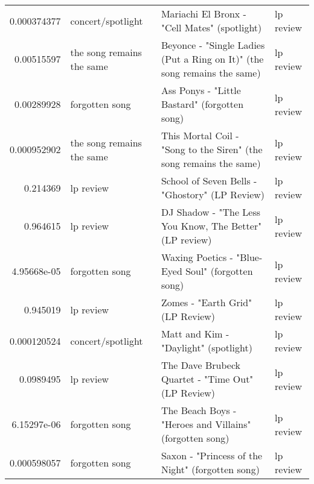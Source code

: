 \documentclass[letterpaper,10pt]{article}
\begin{document}
\begin{table}[H]
\begin{adjustbox}{max width=\linewidth}
\begin{tabular}{rlll}
  0.000374377 & concert/spotlight         & Mariachi El Bronx - "Cell Mates" (spotlight)                                                                 & lp review                 \\
  0.00515597  & the song remains the same & Beyonce - "Single Ladies (Put a Ring on It)" (the song remains the same)                                     & lp review                 \\
  0.00289928  & forgotten song            & Ass Ponys - "Little Bastard" (forgotten song)                                                                & lp review                 \\
  0.000952902 & the song remains the same & This Mortal Coil - "Song to the Siren" (the song remains the same)                                           & lp review                 \\
  0.214369    & lp review                 & School of Seven Bells - "Ghostory" (LP Review)                                                               & lp review                 \\
  0.964615    & lp review                 & DJ Shadow - "The Less You Know, The Better" (LP review)                                                      & lp review                 \\
  4.95668e-05 & forgotten song            & Waxing Poetics - "Blue-Eyed Soul" (forgotten song)                                                           & lp review                 \\
  0.945019    & lp review                 & Zomes - "Earth Grid" (LP Review)                                                                             & lp review                 \\
  0.000120524 & concert/spotlight         & Matt and Kim - "Daylight" (spotlight)                                                                        & lp review                 \\
  0.0989495   & lp review                 & The Dave Brubeck Quartet - "Time Out" (LP Review)                                                            & lp review                 \\
  6.15297e-06 & forgotten song            & The Beach Boys - "Heroes and Villains" (forgotten song)                                                      & lp review                 \\
  0.000598057 & forgotten song            & Saxon - "Princess of the Night" (forgotten song)                                                             & lp review                 \\

\end{tabular}
\end{adjustbox}
\end{table}
\end{document}
